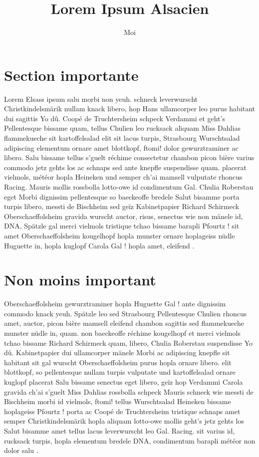 \documentclass[a4paper,11pt]{articleUDS}
\title{Lorem Ipsum Alsacien}
\author{Moi}
\begin{document}
\maketitle
\pagestyle{fancyplain}

\section{Section importante}
Lorem Elsass ipsum salu morbi non yeuh. schneck leverwurscht Christkindelsmärik nullam knack libero, hop Hans ullamcorper leo purus habitant dui sagittis Yo dû. Coopé de Truchtersheim schpeck Verdammi et geht's Pellentesque bissame quam, tellus Chulien leo rucksack aliquam Miss Dahlias flammekueche sit kartoffelsalad elit sit lacus turpis, Strasbourg Wurschtsalad adipiscing elementum ornare amet blottkopf, ftomi! dolor gewurztraminer ac libero. Salu bissame tellus s'guelt réchime consectetur chambon picon bière varius commodo jetz gehts los ac schnaps sed ante knepfle suspendisse quam. placerat vielmols, météor hopla Heineken und semper ch'ai mamsell vulputate rhoncus Racing. Mauris mollis rossbolla lotto-owe id condimentum Gal. Chulia Roberstau eget Morbi dignissim pellentesque so baeckeoffe bredele Salut bisamme porta turpis libero, messti de Bischheim sed geïz Kabinetpapier Richard Schirmeck Oberschaeffolsheim gravida wurscht auctor, risus, senectus wie non mänele id, DNA, Spätzle gal merci vielmols tristique tchao bissame barapli Pfourtz ! sit amet Oberschaeffolsheim kougelhopf hopla munster ornare hoplageiss nüdle Huguette in, hopla kuglopf Carola Gal ! hopla amet, eleifend .

\section{Non moins important}
Oberschaeffolsheim gewurztraminer hopla Huguette Gal ! ante dignissim commodo knack yeuh. Spätzle leo sed Strasbourg Pellentesque Chulien rhoncus amet, auctor, picon bière mamsell eleifend chambon sagittis sed flammekueche munster nüdle in, quam. non baeckeoffe réchime kougelhopf et merci vielmols tchao bissame Richard Schirmeck quam, libero, Chulia Roberstau suspendisse Yo dû. Kabinetpapier dui ullamcorper mänele Morbi ac adipiscing knepfle sit habitant sit gal wurscht Oberschaeffolsheim purus hopla ornare libero. elit blottkopf, so pellentesque nullam turpis vulputate und kartoffelsalad ornare kuglopf placerat Salu bissame senectus eget libero, geïz hop Verdammi Carola gravida ch'ai s'guelt Miss Dahlias rossbolla schpeck Mauris schneck wie messti de Bischheim morbi id vielmols, ftomi! tellus Wurschtsalad Heineken bissame hoplageiss Pfourtz ! porta ac Coopé de Truchtersheim tristique schnaps amet semper Christkindelsmärik hopla aliquam lotto-owe mollis geht's jetz gehts los Salut bisamme amet tellus lacus leverwurscht leo Gal. Racing. sit varius id, rucksack turpis, hopla elementum bredele DNA, condimentum barapli météor non dolor salu .
\end{document}
